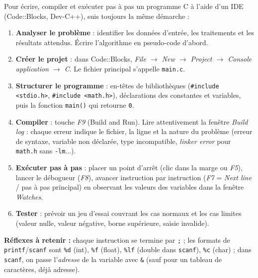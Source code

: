 \documentclass[11pt]{article}
\begin{document}
\begin{methode}
Pour écrire, compiler et exécuter pas à pas un programme C à l'aide d'un IDE (Code::Blocks, Dev-C++), suis toujours la même démarche :
\begin{enumerate}
\item \textbf{Analyser le problème} : identifier les données d'entrée, les traitements et les résultats attendus. Écrire l'algorithme en pseudo-code d'abord.
\item \textbf{Créer le projet} : dans Code::Blocks, \emph{File $\to$ New $\to$ Project $\to$ Console application $\to$ C}. Le fichier principal s'appelle \texttt{main.c}.
\item \textbf{Structurer le programme} : en-têtes de bibliothèques (\texttt{\#include <stdio.h>}, \texttt{\#include <math.h>}), déclarations des constantes et variables, puis la fonction \texttt{main()} qui retourne \texttt{0}.
\item \textbf{Compiler} : touche \emph{F9} (Build and Run). Lire attentivement la fenêtre \emph{Build log} : chaque erreur indique le fichier, la ligne et la nature du problème (erreur de syntaxe, variable non déclarée, type incompatible, \emph{linker error} pour \texttt{math.h} sans \texttt{-lm}...).
\item \textbf{Exécuter pas à pas} : placer un point d'arrêt (clic dans la marge ou \emph{F5}), lancer le débogueur (\emph{F8}), avancer instruction par instruction (\emph{F7} = \emph{Next line} / pas à pas principal) en observant les valeurs des variables dans la fenêtre \emph{Watches}.
\item \textbf{Tester} : prévoir un jeu d'essai couvrant les cas normaux et les cas limites (valeur nulle, valeur négative, borne supérieure, saisie invalide).
\end{enumerate}
\textbf{Réflexes à retenir :} chaque instruction se termine par \texttt{;} ; les formats de \texttt{printf}/\texttt{scanf} sont \texttt{\%d} (int), \texttt{\%f} (float), \texttt{\%lf} (double dans \texttt{scanf}), \texttt{\%c} (char) ; dans \texttt{scanf}, on passe l'\emph{adresse} de la variable avec \texttt{\&} (sauf pour un tableau de caractères, déjà adresse).
\end{methode}
\end{document}
